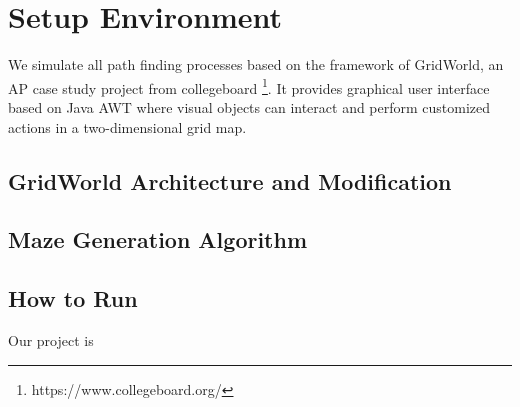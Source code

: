 \section{Setup Environment}

We simulate all path finding processes based on the framework of 
GridWorld\cite{web:gridworld}, an AP case study project from collegeboard
\footnote{https://www.collegeboard.org/}. It provides graphical user interface 
based on Java AWT where visual objects can interact and perform customized 
actions in a two-dimensional grid map.

\subsection{GridWorld Architecture and Modification}

\subsection{Maze Generation Algorithm}

\subsection{How to Run}
Our project is 
